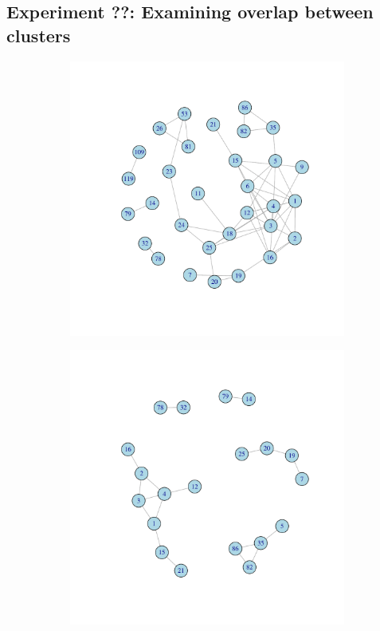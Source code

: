 \documentclass[12pt, oneside]{article}   	%
\begin{document}
\subsection{Experiment ??: Examining overlap between clusters}

\begin{figure}[H]
	\centering
	\begin{subfigure}[t]{0.48\textwidth}
	 \centering
	 \includegraphics[width=\linewidth]{ikc10_k_pw.pdf} 
	 \end{subfigure}
 \hfill
	\begin{subfigure}[t]{0.48\textwidth}
        \centering
        \includegraphics[width=\linewidth]{ikc10_m_pw.pdf} 

\end{subfigure}
\end{figure}
\end{document}
